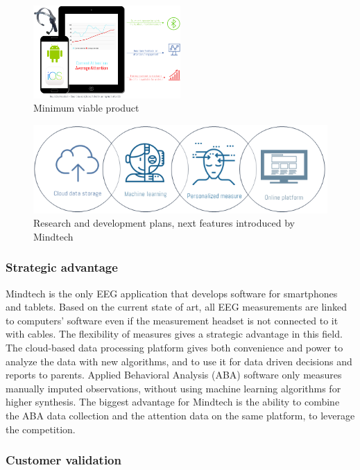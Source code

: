 \documentclass[letterpaper,10pt]{article}
\begin{document}
\begin{figure}
\centering
\includegraphics[width=0.5\textwidth]{mvp.PNG}
\caption{Minimum viable product}
\label{img:mvp}
\end{figure}

\begin{figure}[!htb]
\centering
\includegraphics[scale=0.5]{followup.PNG}
\caption{Research and development plans, next features introduced by Mindtech}
\label{img:nextgen}
\end{figure}

\subsubsection{Strategic advantage}

Mindtech is the only EEG application that develops  software for smartphones and tablets. Based on the current state of art, all EEG measurements are linked to computers’ software even if the measurement headset is not connected to it with cables. The flexibility of measures gives a strategic advantage in this field. The cloud-based data processing platform gives both convenience and power to analyze the data with new algorithms, and to use it for data driven decisions and reports to parents. Applied Behavioral Analysis (ABA) software only measures manually imputed observations, without using machine learning algorithms for higher synthesis. The biggest advantage for Mindtech is the ability to combine the ABA data collection and the attention data on the same platform, to leverage the competition. 

\subsubsection{Customer validation}
\end{document}
